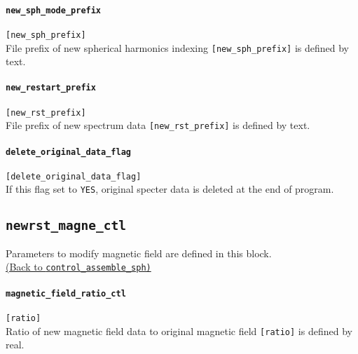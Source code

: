 \paragraph{\tt new\_sph\_mode\_prefix}
\label{href_t:new_sph_mode_prefix}
\verb|[new_sph_prefix]| \\
File prefix of new spherical harmonics indexing \verb|[new_sph_prefix]| is defined by text.

\paragraph{\tt new\_restart\_prefix}
\label{href_t:new_restart_prefix}
\verb|[new_rst_prefix]| \\
File prefix of new spectrum data \verb|[new_rst_prefix]| is defined by text.

\paragraph{\tt delete\_original\_data\_flag}
\label{href_t:delete_original_data_flag}
\verb|[delete_original_data_flag]| \\
If this flag set to \verb|YES|, original specter data is deleted at the end of program. 

\subsection{\tt newrst\_magne\_ctl}
\label{href_t:newrst_magne_ctl}
Parameters to modify magnetic field are defined in this block. \\
\hyperref[href_i:newrst_magne_ctl]{(Back to {\tt control\_assemble\_sph)}}

\paragraph{\tt magnetic\_field\_ratio\_ctl}
\label{href_t:magnetic_field_ratio_ctl} 
\verb|[ratio]| \\
Ratio of new magnetic field data to original magnetic field \verb|[ratio]| is defined by real.

